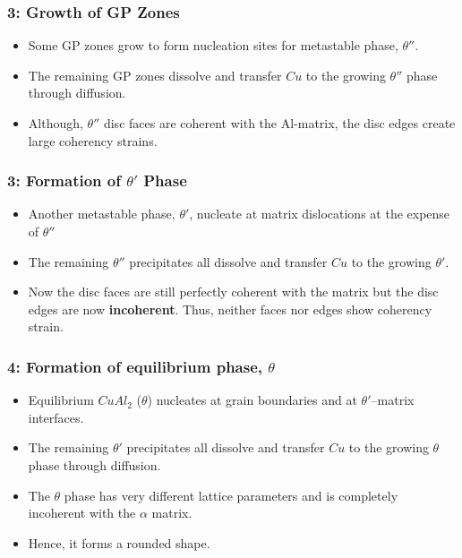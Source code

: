 
\subsubsection{3: Growth of GP Zones} %
\label{ssub:growth_of_gp_zones}


\begin{itemize}
  \item Some GP zones grow to form nucleation sites for metastable phase, $\theta''$.
  \item The remaining GP zones dissolve and transfer $Cu$ to the growing $\theta''$ phase through diffusion.
  \item Although, $\theta''$ disc faces are coherent with the Al-matrix, the disc edges create large coherency strains.
\end{itemize}


\subsubsection{3: Formation of $\theta'$ Phase} %
\label{ssub:formation_of_thata}


\begin{itemize}
  \item Another metastable phase, $\theta'$, nucleate at matrix dislocations at the expense of $\theta''$
  \item The  remaining $\theta''$ precipitates all dissolve and transfer $Cu$ to the growing  $\theta'$.
  \item Now the disc faces are still perfectly coherent with the matrix but the disc edges are now \textbf{incoherent}. Thus, neither faces nor edges show coherency strain.
\end{itemize}


\subsubsection{4: Formation of equilibrium phase, $\theta$} %
\label{ssub:formation_of_equilibrium_phase_}


\begin{itemize}
  \item Equilibrium $CuAl_2$ ($\theta$) nucleates at grain boundaries and at  $\theta'$–matrix interfaces.
  \item The  remaining $\theta'$ precipitates all dissolve and transfer $Cu$ to the growing $\theta$ phase through diffusion.
  \item The $\theta$ phase has very different lattice parameters and is completely incoherent with the $\alpha$ matrix.
  \item Hence, it forms a rounded shape.
\end{itemize}

